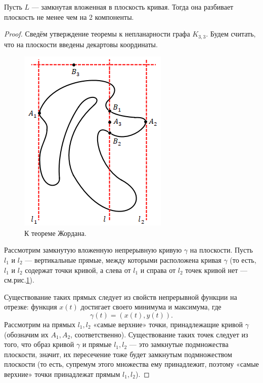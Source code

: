 \begin{statement}
    Пусть $L$ — замкнутая вложенная в плоскость кривая. Тогда она разбивает плоскость не менее чем на 2 компоненты.
\end{statement}
\begin{proof}
    Сведём утверждение теоремы к непланарности графа $K_{3,3}$. Будем считать, что на плоскости введены декартовы координаты.
    \begin{figure}[h]
        \centering
        \includegraphics[scale=0.8]{images/c5.3.png}
        \caption{К теореме Жордана.}
        \label{fig:c5.3}
    \end{figure}
    Рассмотрим замкнутую вложенную непрерывную кривую $\gamma$ на плоскости. Пусть $l_1$ и $l_2$ — вертикальные прямые, между которыми расположена кривая $\gamma$ (то есть, $l_1$ и $l_2$ содержат точки кривой, а слева от $l_1$ и справа от $l_2$ точек кривой нет — см.рис.\ref{fig:c5.3}).

    Существование таких прямых следует из свойств непрерывной функции на отрезке: функция $x(t)$ достигает своего минимума и максимума, где \[\gamma(t) = \left(x(t), y(t)\right).\]
    Рассмотрим на прямых $l_1, l_2$ «самые верхние» точки, принадлежащие кривой $\gamma$ (обозначим их $A_1, A_2$, соответственно). Существование таких точек следует из того, что образ кривой $\gamma$ и прямые $l_1, l_2$ — это замкнутые подмножества плоскости, значит, их пересечение тоже будет замкнутым подмножеством плоскости (то есть, супремум этого множества ему принадлежит, поэтому «самые верхние» точки принадлежат прямым $l_1, l_2$).


\end{proof}
